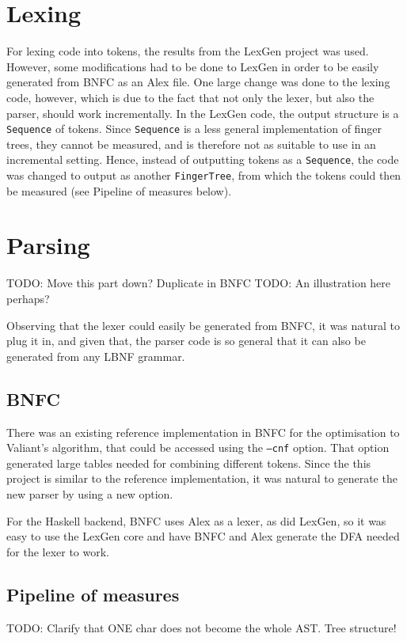 \documentclass[a4paper,12pt,twosided]{report}
\begin{document}
\section{Lexing}
For lexing code into tokens, the results from the LexGen project was used.
However, some modifications had to be done to LexGen in order to be easily
generated from BNFC as an Alex file. One large change was done to the lexing
code, however, which is due to the fact that not only the lexer, but also the
parser, should work incrementally. In the LexGen code, the output structure is a
\texttt{Sequence} of tokens. Since \texttt{Sequence} is a less general
implementation of finger trees, they cannot be measured, and is therefore not as
suitable to use in an incremental setting. Hence, instead of outputting tokens
as a \texttt{Sequence}, the code was changed to output as another
\texttt{FingerTree}, from which the tokens could then be measured (see Pipeline
of measures below).

\section{Parsing}
TODO: Move this part down? Duplicate in BNFC
TODO: An illustration here perhaps?

Observing that the lexer could easily be generated from BNFC, it was natural to
plug it in, and given that, the parser code is so general that it can also be
generated from any LBNF grammar.
\subsection{BNFC}
There was an existing reference implementation in BNFC for the optimisation to
Valiant's algorithm, that could be accessed using the \texttt{--cnf} option.
That option generated large tables needed for combining different tokens. Since
the this project is similar to the reference implementation, it was natural to
generate the new parser by using a new option.

For the Haskell backend, BNFC uses Alex as a lexer, as did LexGen, so it was
easy to use the LexGen core and have BNFC and Alex generate the DFA needed for
the lexer to work. 

\subsection{Pipeline of measures}
TODO: Clarify that ONE char does not become the whole AST. Tree structure!
\end{document}
